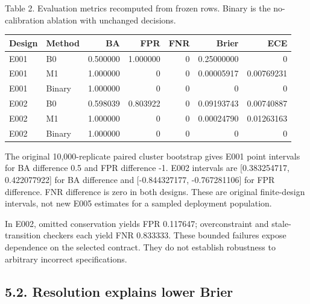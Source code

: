\noindent\begin{minipage}{\linewidth}
\noindent Table 2. Evaluation metrics recomputed from frozen rows. Binary is the
no-calibration ablation with unchanged decisions.
\par\medskip\centering
\begin{tabular}{@{}llrrrrr@{}}
\toprule
Design & Method & BA & FPR & FNR & Brier & ECE \\
\midrule

E001 & B0 & 0.500000 & 1.000000 & 0 & 0.25000000 & 0 \\
E001 & M1 & 1.000000 & 0 & 0 & 0.00005917 & 0.00769231 \\
E001 & Binary & 1.000000 & 0 & 0 & 0 & 0 \\
E002 & B0 & 0.598039 & 0.803922 & 0 & 0.09193743 & 0.00740887 \\
E002 & M1 & 1.000000 & 0 & 0 & 0.00024790 & 0.01263163 \\
E002 & Binary & 1.000000 & 0 & 0 & 0 & 0 \\
\bottomrule
\end{tabular}
\end{minipage}


The original 10,000-replicate paired cluster bootstrap gives E001 point
intervals for BA difference 0.5 and FPR difference -1. E002 intervals
are {[}0.383254717, 0.422077922{]} for BA difference and
{[}-0.844327177, -0.767281106{]} for FPR difference. FNR difference is
zero in both designs. These are original finite-design intervals, not
new E005 estimates for a sampled deployment population.

In E002, omitted conservation yields FPR 0.117647; overconstraint and
stale-transition checkers each yield FNR 0.833333. These bounded
failures expose dependence on the selected contract. They do not
establish robustness to arbitrary incorrect specifications.

\hypertarget{resolution-explains-lower-brier}{%
\subsection{5.2. Resolution explains lower
Brier}\label{resolution-explains-lower-brier}}

